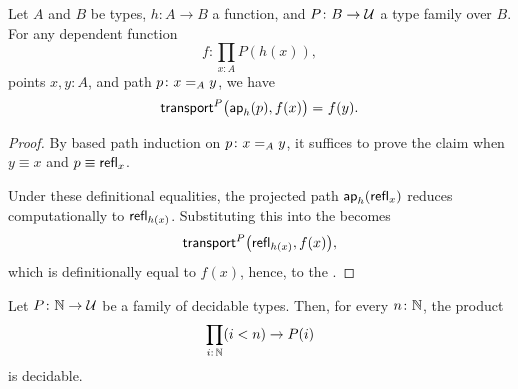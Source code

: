 \begin{lem}\label{lem:transport-ap}
    Let\/ $A$ and\/ $B$ be types, $h\colon A\to B$ a function, and\/ $P\colon B\to\univ$ a type family over\/ $B$. For any dependent function
    \[
        f\colon\prod_{x\colon A}P(h(x)),
    \]
    points\/ $x,y\colon A$, and path\/ $p\colon x\eq Ay$, we have
    \[
        \mathsf{transport}^P\bigl(\mathsf{ap}_h(p), f(x)\bigr) \mathrel{=_{}} f(y).
    \]
\end{lem}

\begin{proof}
    By based path induction on $p\colon x\eq Ay$, it suffices to prove the claim when $y\equiv x$ and $p\equiv\mathsf{refl}_x$.
    
    Under these definitional equalities, the projected path $\mathsf{ap}_h(\mathsf{refl}_x)$ reduces computationally to $\mathsf{refl}_{h(x)}$. Substituting this into the \lhs becomes
    \[
        \mathsf{transport}^P\bigl(
            \mathsf{refl}_{h(x)},
            f(x)
        \bigr),
    \]
    which is definitionally equal to $f(x)$, hence, to the \rhs.
\end{proof}

\begin{thm}\label{thm:domain-bounded-products-are-decidable}
    Let\/ $P\colon\N\to\univ$ be a family of decidable types. Then, for every\/ $n\colon\N$, the product
    \[
        \prod_{i\colon\N}(i<n)\to P(i)
    \]
    is decidable.
\end{thm}

